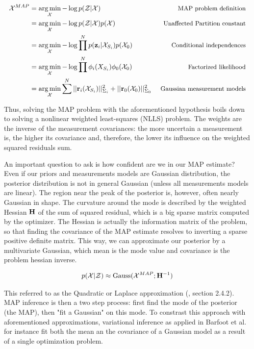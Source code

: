 \begin{align}
    \mathcal{X}^{MAP} 
    &= \operatorname*{arg\,min}_{\mathcal{X}} - \log p(\mathcal{Z} | \mathcal{X}) ~&\mbox{\small MAP problem definition}\\
    &= \operatorname*{arg\,min}_{\mathcal{X}} - \log p(\mathcal{Z} | \mathcal{X}) p(\mathcal{X}) ~&\mbox{\small Unaffected Partition constant}\\
    &= \operatorname*{arg\,min}_{\mathcal{X}} - \log \prod^{N} p({\bf z}_i | \mathcal{X}_{S_i}) p(\mathcal{X}_0) ~&\mbox{\small Conditional independences}\\
    &= \operatorname*{arg\,min}_{\mathcal{X}} - \log \prod^{N} \phi_i(X_{S_i}) \phi_0(\mathcal{X}_{0}) ~&\mbox{\small Factorized likelihood}\\
    &= \operatorname*{arg\,min}_{\mathcal{X}} \sum^{N} ||{\bf r}_i(\mathcal{X}_{S_i})||_{\Sigma_i}^2 + ||{\bf r}_0(\mathcal{X}_{0})||_{\Sigma_0}^2 ~&\mbox{\small Gaussian measurement models}\\
\end{align}

Thus, solving the MAP problem with the aforementioned hypothesis boils down to solving a nonlinear weighted least-squares (NLLS) problem.
The weights are the inverse of the measurement covariances: the more uncertain a measurement is, the higher its covariance and, therefore, the lower its influence
on the weighted squared residuals sum. 

An important question to ask is how confident are we in our MAP estimate? Even if our priors and measurements models are Gaussian distribution, the posterior distribution
is not in general Gaussian (unless all measurements models are linear). The region near the peak of the posterior is, however, often nearly Gaussian in shape.
The curvature around the mode is described by the weighted Hessian ${\bf H}$ of the sum of squared residual, which is a big sparse matrix computed by the optimizer.
The Hessian is actually the information matrix of the problem, so that finding the covariance of the MAP estimate resolves to inverting a sparse positive definite 
matrix. This way, we can approximate our posterior by a multivariate Gaussian, which mean is the mode value and covariance is the problem hessian inverse. 

\begin{equation}
    p(\mathcal{X} | \mathcal{Z}) \approx \text{Gauss}(\mathcal{X}^{MAP}; {\bf H}^{-1})
    \label{eq:map_laplace}
\end{equation}

This referred to as the Quadratic or Laplace approximation (\cite{mcelreath2018statistical}, section 2.4.2). MAP inference is then a two step process: 
first find the mode of the posterior (the MAP), then "fit a Gaussian" on this mode. 
To constrast this approach with aforementioned approximations, variational inference as applied in Barfoot et al. 
 \cite{barfoot2020exactly} for instance fit both the mean an the covariance of a Gaussian model as a result of a single optimization problem.

